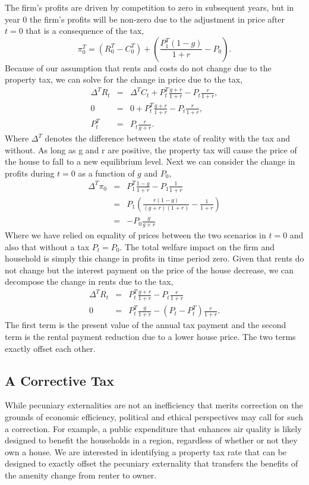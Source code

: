 \documentclass[ecta,nameyear,draft]{econsocart}
\theoremstyle{plain}
\theoremstyle{remark}
\begin{document}
The firm's profits are driven by competition to zero in subsequent years, but in year 0 the firm's profits will be non-zero due to the adjustment in price after $t=0$ that is a consequence of the tax,
\begin{equation}
	\pi^T_0 = (R^T_0-C^T_0)+\left(\frac{P^T_{1}(1-g)}{1+r}-P_0\right).\label{piT0}
\end{equation}
Because of our assumption that rents and costs do not change due to the property tax, we can solve for the change in price due to the tax,
\begin{eqnarray}
	\Delta^T R_t&=&\Delta^T C_t+P^T_{t}\frac{g+r}{1+r}-P_{t} \frac{r}{1+r},\nonumber \\
	0&=&0+P^T_{t}\frac{g+r}{1+r}-P_{t} \frac{r}{1+r},\nonumber \\
	P^T_t&=& P_t\frac{r}{g+r}.\label{TxPrice}
\end{eqnarray}
Where $\Delta^T$ denotes the difference between the state of reality with the tax and without. As long as g and r are positive, the property tax will cause the price of the house to fall to a new equilibrium level.
Next we can consider the change in profits during $t=0$ as a function of $g$ and $P_0$,
\begin{eqnarray*}
	\Delta^T \pi_0 &=& P_1^T\frac{1-g}{1+r}-P_1\frac{1}{1+r}\\
	&=& P_1\left(\frac{r(1-g)}{(g+r)(1+r)}-\frac{1}{1+r}\right)\\
	&=&-P_0\frac{g}{g+r}
\end{eqnarray*}
Where we have relied on equality of prices between the two scenarios in $t=0$ and also that without a tax $P_t=P_0$. The total welfare impact on the firm and household is simply this change in profits in time period zero.
Given that rents do not change but the interest payment on the price of the house decrease, we can decompose the change in rents due to the tax,
\begin{eqnarray*}
	\Delta^T R_t&=&P^T_t\frac{g+r}{1+r}-P_t\frac{r}{1+r}\\
	0&=&P^T_t\frac{g}{1+r}-(P_t-P_t^T)\frac{r}{1+r}.
\end{eqnarray*}
The first term is the present value of the annual tax payment and the second term is the rental payment reduction due to a lower house price. The two terms exactly offset each other.

\subsection{A Corrective Tax}
While pecuniary externalities are not an inefficiency that merits correction on the grounds of economic efficiency, political and ethical perspectives may call for such a correction. For example, a public expenditure that enhances air quality is likely designed to benefit the households in a region, regardless of whether or not they own a house. We are interested in identifying a property tax rate that can be designed to exactly offset the pecuniary externality that transfers the benefits of the amenity change from renter to owner.
\end{document}
